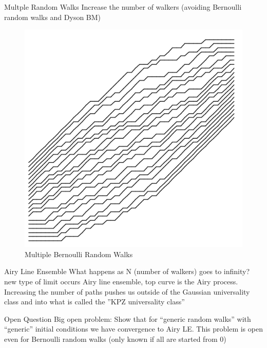 \documentclass[9pt,t]{beamer}
\begin{document}
\begin{frame}{Multple Random Walks}
Increase the number of walkers (avoiding Bernoulli random walks and Dyson BM)
\begin{figure}
	\includegraphics[height=0.5\textheight]{graphics/MultipleBernoulli.png}
	\caption{Multiple Bernoulli Random Walks}
\end{figure}
\end{frame}
\begin{frame}{Airy Line Ensemble}
What happens as N (number of walkers) goes to infinity? new type of limit occurs Airy line ensemble, top curve is the Airy process. Increasing the number of paths pushes us outside of the Gaussian universality class and into what is called the ”KPZ universality class”
\end{frame}
\begin{frame}{Open Question}
Big open problem: Show that for “generic random walks” with “generic” initial conditions we have convergence to Airy LE. This problem is open even for Bernoulli random walks (only known if all are started from 0)
\end{frame}
\end{document}
